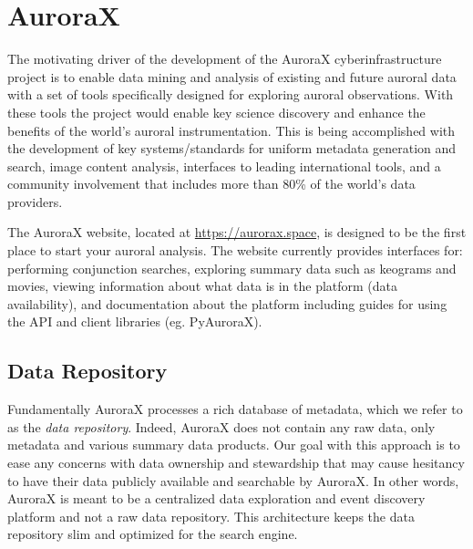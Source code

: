 \documentclass[utf8]{FrontiersinHarvard} %
\begin{document}
\section{AuroraX}\label{aurorax}
The motivating driver of the development of the AuroraX cyberinfrastructure project is to enable data mining and analysis of existing and future auroral data with a set of tools specifically designed for exploring auroral observations. With these tools the project would enable key science discovery and enhance the benefits of the world's auroral instrumentation. This is being accomplished with the development of key systems/standards for uniform metadata generation and search, image content analysis, interfaces to leading international tools, and a community involvement that includes more than 80\% of the world's data providers. 

The AuroraX website, located at \url{https://aurorax.space}, is designed to be the first place to start your auroral analysis. The website currently provides interfaces for: performing conjunction searches, exploring summary data such as keograms and movies, viewing information about what data is in the platform (data availability), and documentation about the platform including guides for using the API and client libraries (eg. PyAuroraX).

\subsection{Data Repository}
Fundamentally AuroraX processes a rich database of metadata, which we refer to as the \textit{data repository}. Indeed, AuroraX does not contain any raw data, only metadata and various summary data products. Our goal with this approach is to ease any concerns with data ownership and stewardship that may cause hesitancy to have their data publicly available and searchable by AuroraX. In other words, AuroraX is meant to be a centralized data exploration and event discovery platform and not a raw data repository. This architecture keeps the data repository slim and optimized for the search engine.
\end{document}
